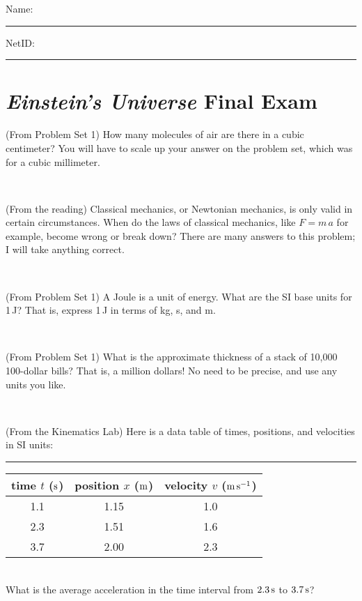 \documentclass[12pt, letterpaper]{article}
\begin{document}
\noindent
Name: \rule[-1ex]{0.60\textwidth}{0.1pt}
NetID: \rule[-1ex]{0.20\textwidth}{0.1pt}

\section*{\textsl{Einstein's Universe} Final Exam}
\setcounter{problem}{1}

\begin{problem}
(From Problem Set 1)
How many molecules of air are there in a cubic centimeter?
You will have to scale up your answer on the problem set, which
was for a cubic millimeter.
\end{problem}

\vfill ~

\begin{problem}
(From the reading)
Classical mechanics, or Newtonian mechanics, is only valid in certain
circumstances. When do the laws of classical mechanics, like $F =
m\,a$ for example, become wrong or break down? There are many answers
to this problem; I will take anything correct.
\end{problem}

\vfill ~

\begin{problem}
(From Problem Set 1)
A Joule is a unit of energy. What are the SI base units for 1\,J? That is,
express 1\,J in terms of kg, s, and m.
\end{problem}

\vfill ~

\begin{problem}
(From Problem Set 1)
What is the approximate thickness of a stack of 10,000 100-dollar bills?
That is, a million dollars!
No need to be precise, and use any units you like.
\end{problem}

\vfill ~

\clearpage

\begin{problem}
(From the Kinematics Lab)
Here is a data table of times, positions, and velocities in SI units:\\
\rule{1.0in}{0pt}\begin{tabular}{c|c|c}
time $t$ ($\mathrm{s}$) & position $x$ ($\mathrm{m}$) & velocity $v$ ($\mathrm{m}\,\mathrm{s}^{-1}$) \\
\hline
1.1 & 1.15 & 1.0 \\
2.3 & 1.51 & 1.6 \\
3.7 & 2.00 & 2.3 \\
\hline
\end{tabular}\\
What is the average acceleration in the time interval from $2.3\,\mathrm{s}$ to $3.7\,\mathrm{s}$?
\end{problem}
\end{document}

